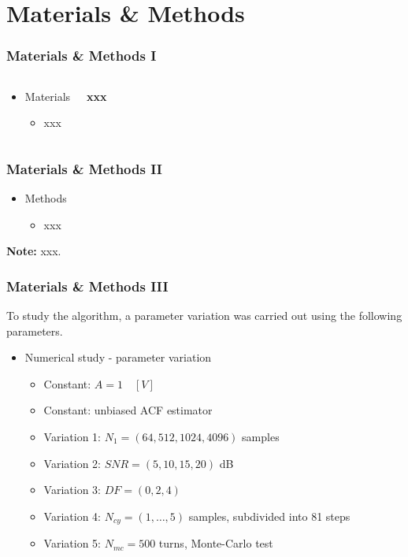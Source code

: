 \documentclass[11pt,aspectratio=169]{beamer}
\begin{document}
	\section{Materials \& Methods}
	\begin{frame}
		\frametitle{Materials \& Methods I}
		\begin{columns}
			\begin{RIPcolleft}
				\begin{itemize}
					\setlength\itemsep{0.5em}
					\item \textcolor{RIPtitlecol}{Materials}
					\begin{itemize}
						\setlength\itemsep{0.5em}
						\item xxx
					\end{itemize}
				\end{itemize}
			\end{RIPcolleft}
			\begin{RIPcolright}
				\textbf{xxx}\\
				\vspace{1em}
			\end{RIPcolright}
		\end{columns}
	\end{frame}
	\begin{frame}
		\frametitle{Materials \& Methods II}
		\begin{itemize}
			\setlength\itemsep{0.5em}
			\item \textcolor{RIPtitlecol}{Methods}
			\begin{itemize}
				\setlength\itemsep{0.5em}
				\item xxx
			\end{itemize}
		\end{itemize}
		\vspace*{.5em}
		\small \textbf{Note:} xxx.
	\end{frame}
	\begin{frame}
		\frametitle{Materials \& Methods III}
		To study the algorithm, a parameter variation was carried out using the following parameters.
		\begin{itemize}
			\setlength\itemsep{0.5em}
			\item \textcolor{RIPtitlecol}{Numerical study - parameter variation}
			\begin{itemize}
				\setlength\itemsep{0.5em}
				\item Constant: $A = 1 \quad [V]$
				\item Constant: unbiased ACF estimator
				\item Variation 1: $N_1 = (64, 512, 1024, 4096)$ samples
				\item Variation 2: $SNR = (5, 10, 15, 20)$ dB
				\item Variation 3: $DF = (0, 2, 4)$
				\item Variation 4: $N_{cy} = (1,\ldots,5)$ samples, subdivided into 81 steps
				\item Variation 5: $N_{mc} = 500$ turns, Monte-Carlo test
			\end{itemize}
		\end{itemize}
	\end{frame}
\end{document}

